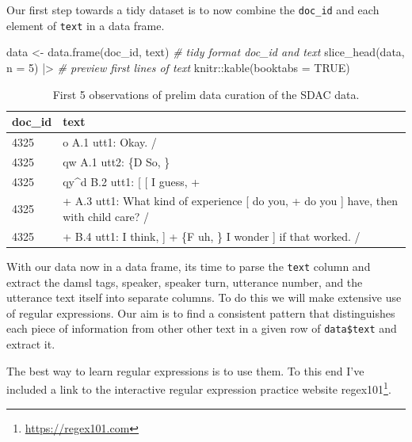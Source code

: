 \documentclass[
  letterpaper,
]{scrbook}
\newenvironment{Shaded}{\begin{snugshade}}{\end{snugshade}}
\newcommand{\AttributeTok}[1]{\textcolor[rgb]{0.00,0.00,0.00}{#1}}
\newcommand{\CommentTok}[1]{\textcolor[rgb]{0.00,0.00,0.00}{\textit{#1}}}
\newcommand{\ConstantTok}[1]{\textcolor[rgb]{0.00,0.00,0.00}{#1}}
\newcommand{\DecValTok}[1]{\textcolor[rgb]{0.00,0.00,0.00}{#1}}
\newcommand{\FunctionTok}[1]{\textcolor[rgb]{0.00,0.00,0.00}{#1}}
\newcommand{\NormalTok}[1]{\textcolor[rgb]{0.00,0.00,0.00}{#1}}
\newcommand{\OtherTok}[1]{\textcolor[rgb]{0.00,0.00,0.00}{#1}}
\newcommand{\SpecialCharTok}[1]{\textcolor[rgb]{0.00,0.00,0.00}{#1}}
\DeclareRobustCommand{\href}[2]{#2\footnote{\url{#1}}}
\begin{document}
Our first step towards a tidy dataset is to now combine the
\texttt{doc\_id} and each element of \texttt{text} in a data frame.

\begin{Shaded}
\begin{Highlighting}[]
\NormalTok{data }\OtherTok{\textless{}{-}} \FunctionTok{data.frame}\NormalTok{(doc\_id, text) }\CommentTok{\# tidy format \textasciigrave{}doc\_id\textasciigrave{} and \textasciigrave{}text\textasciigrave{}}
\FunctionTok{slice\_head}\NormalTok{(data, }\AttributeTok{n =} \DecValTok{5}\NormalTok{) }\SpecialCharTok{|\textgreater{}} \CommentTok{\# preview first lines of \textasciigrave{}text\textasciigrave{}}
\NormalTok{  knitr}\SpecialCharTok{::}\FunctionTok{kable}\NormalTok{(}\AttributeTok{booktabs =} \ConstantTok{TRUE}\NormalTok{)}
\end{Highlighting}
\end{Shaded}

\hypertarget{tbl-cd-semi-sdac-text-8}{}
\begin{table}
\caption{\label{tbl-cd-semi-sdac-text-8}First 5 observations of prelim data curation of the SDAC data. }\tabularnewline

\centering
\begin{tabular}{ll}
\toprule
doc\_id & text\\
\midrule
4325 & o          A.1 utt1: Okay.  /\\
4325 & qw          A.1 utt2: \{D So, \}\\
4325 & qy\textasciicircum{}d          B.2 utt1: [ [ I guess, +\\
4325 & +          A.3 utt1: What kind of experience [ do you, + do you ] have, then with child care? /\\
4325 & +          B.4 utt1: I think, ] + \{F uh, \} I wonder ] if that worked. /\\
\bottomrule
\end{tabular}
\end{table}

With our data now in a data frame, its time to parse the \texttt{text}
column and extract the damsl tags, speaker, speaker turn, utterance
number, and the utterance text itself into separate columns. To do this
we will make extensive use of regular expressions. Our aim is to find a
consistent pattern that distinguishes each piece of information from
other other text in a given row of \texttt{data\$text} and extract it.

The best way to learn regular expressions is to use them. To this end
I've included a link to the interactive regular expression practice
website \href{https://regex101.com}{regex101}.
\end{document}
